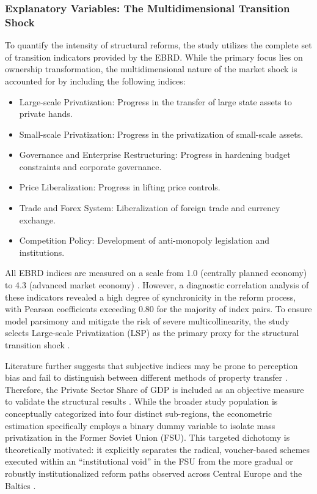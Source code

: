 \documentclass[12pt]{article}
\begin{document}
\subsubsection*{Explanatory Variables: The Multidimensional Transition Shock}
To quantify the intensity of structural reforms, the study utilizes the complete set of transition indicators provided by the EBRD. 
While the primary focus lies on ownership transformation, the multidimensional nature of the market shock is accounted for by including 
the following indices:

\begin{itemize}
    \item Large-scale Privatization: Progress in the transfer of large state assets to private hands.
    \item Small-scale Privatization: Progress in the privatization of small-scale assets.
    \item Governance and Enterprise Restructuring: Progress in hardening budget constraints and corporate governance.
    \item Price Liberalization: Progress in lifting price controls.
    \item Trade and Forex System: Liberalization of foreign trade and currency exchange.
    \item Competition Policy: Development of anti-monopoly legislation and institutions.
\end{itemize}

All EBRD indices are measured on a scale from 1.0 (centrally planned economy) to 4.3 (advanced market economy) \citep{Stuckler2009, EBRD1999}. 
However, a diagnostic correlation analysis of these indicators revealed a high degree of synchronicity in the reform process, with Pearson coefficients 
exceeding 0.80 for the majority of index pairs. To ensure model parsimony and mitigate the risk of severe multicollinearity, the study selects Large-scale 
Privatization (LSP) as the primary proxy for the structural transition shock \citep{Gerry2010}.

Literature further suggests that subjective indices may be prone to perception bias and fail to distinguish between different methods of property transfer 
\citep{Hamm2012, Stuckler2009}. Therefore, the Private Sector Share of GDP is included as an objective measure to validate the structural results \citep{Hamm2012, Bennett2007}. 
While the broader study population is conceptually categorized into four distinct sub-regions, the econometric estimation specifically employs a binary dummy variable to isolate 
mass privatization in the Former Soviet Union (FSU). This targeted dichotomy is theoretically motivated: it explicitly separates the radical, voucher-based schemes executed 
within an ``institutional void'' in the FSU from the more gradual or robustly institutionalized reform paths observed across Central Europe and the Baltics 
\citep{Estrin2004, Earle2013, Roland2000, King2001}.
\end{document}
